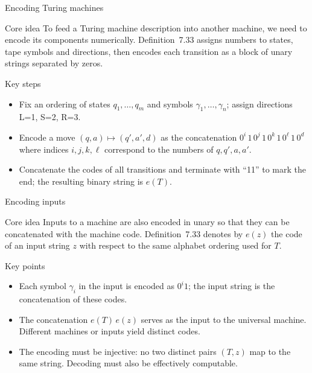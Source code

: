 \begin{frame}[t]{Encoding Turing machines}
  \begin{tblock}{Core idea}
    To feed a Turing machine description into another machine, we need
    to encode its components numerically.  Definition 7.33 assigns
    numbers to states, tape symbols and directions, then encodes each
    transition as a block of unary strings separated by zeros.
  \end{tblock}
  \begin{tblock}{Key steps}
    \begin{itemize}
      \item Fix an ordering of states $q_1,\dots,q_m$ and symbols
        $\gamma_1,\dots,\gamma_n$; assign directions L=1, S=2, R=3.
      \item Encode a move $(q,a)\mapsto (q',a',d)$ as the concatenation
        $0^{i}\,1\,0^{j}\,1\,0^{k}\,1\,0^{\ell}\,1\,0^{d}$ where
        indices $i,j,k,\ell$ correspond to the numbers of $q,q',a,a'$.
      \item Concatenate the codes of all transitions and terminate
        with “11” to mark the end; the resulting binary string is
        $e(T)$.
    \end{itemize}
  \end{tblock}
  \label{fr:7.8-02}
\end{frame}

\begin{frame}[t]{Encoding inputs}
  \begin{tblock}{Core idea}
    Inputs to a machine are also encoded in unary so that they can be
    concatenated with the machine code.  Definition 7.33 denotes by
    $e(z)$ the code of an input string $z$ with respect to the same
    alphabet ordering used for $T$.
  \end{tblock}
  \begin{tblock}{Key points}
    \begin{itemize}
      \item Each symbol $\gamma_i$ in the input is encoded as $0^i 1$;
        the input string is the concatenation of these codes.
      \item The concatenation $e(T)\,e(z)$ serves as the input to the
        universal machine.  Different machines or inputs yield distinct
        codes.
      \item The encoding must be injective: no two distinct pairs
        $(T,z)$ map to the same string.  Decoding must also be
        effectively computable.
    \end{itemize}
  \end{tblock}
  \label{fr:7.8-03}
\end{frame}


